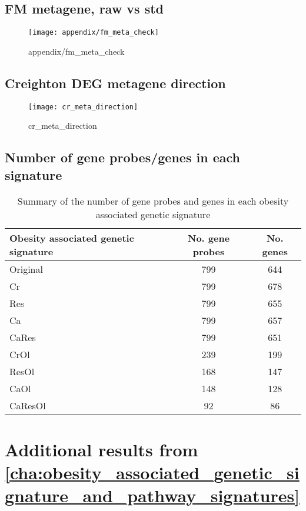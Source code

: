 \begin{appendices}
	\section{FM metagene, raw vs std}
	\label{sec:fm_metagene_raw_vs_std}
	
	\begin{figure}[htpb]
		\centering
		\texttt{[image: appendix/fm\_meta\_check]}
		\caption{appendix/fm_meta_check}
		\label{fig:appendix/fm_meta_check}
	\end{figure}
	

	\section{Creighton DEG metagene direction}
	\label{sec:creighton_deg_metagene_direction}
	
	\begin{figure}[htpb]
		\centering
		\texttt{[image: cr\_meta\_direction]}
		\caption{cr_meta_direction}
		\label{fig:cr_meta_direction}
	\end{figure}
	
	
	\section{Number of gene probes/genes in each signature}
	\label{app:number_of_gene_probes_genes_in_each_signature}
	
	\begin{table}[htbp]
		\centering
		\caption{Summary of the number of gene probes and genes in each obesity associated genetic signature}
		\label{tab:signature_gene_num}
		\begin{tabular}{lcc}
			Obesity associated genetic signature & No. gene probes   & No. genes\\
			\hline
			\rule{0pt}{2.25ex}Original & 799 & 644\\
			Cr                         & 799 & 678\\
			Res                        & 799 & 655\\
			Ca                         & 799 & 657\\
			CaRes                      & 799 & 651\\
			CrOl                       & 239 & 199\\
			ResOl                      & 168 & 147\\
			CaOl                       & 148 & 128\\
			CaResOl                    & 92  & 86\\
			\hline
			\hline
		\end{tabular}
	\end{table}

	\chapter{Additional results from \cref{cha:obesity_associated_genetic_signature_and_pathway_signatures}}
	\label{app:b}




\end{appendices}
